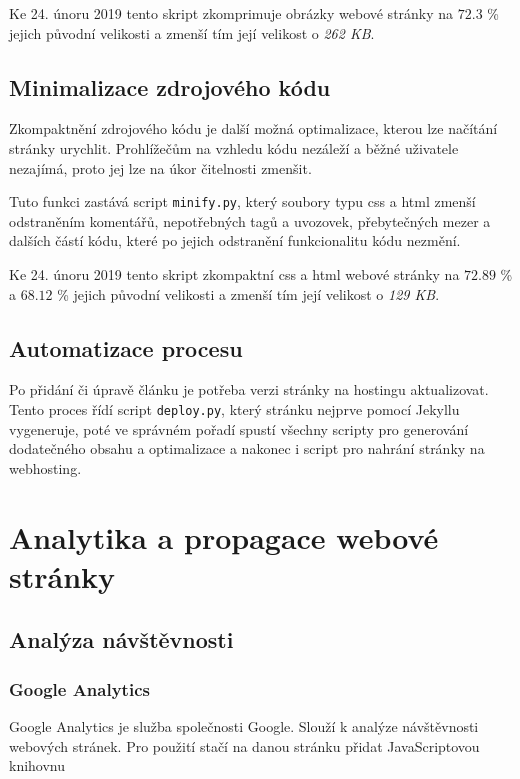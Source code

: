 \documentclass[a4paper, 12pt]{article}
\begin{document}
  Ke 24. únoru 2019 tento skript zkomprimuje obrázky webové stránky na $72.3$ \% jejich původní velikosti a zmenší tím její velikost o \emph{262 KB}.


  \subsection{Minimalizace zdrojového kódu}
  Zkompaktnění zdrojového kódu je další možná optimalizace, kterou lze načítání stránky urychlit. Prohlížečům na vzhledu kódu nezáleží a běžné uživatele nezajímá, proto jej lze na úkor čitelnosti zmenšit.

  Tuto funkci zastává script \texttt{minify.py}, který soubory typu \gls{css} a \gls{html} zmenší odstraněním komentářů, nepotřebných tagů a uvozovek, přebytečných mezer a dalších částí kódu, které po jejich odstranění funkcionalitu kódu nezmění.

  Ke 24. únoru 2019 tento skript zkompaktní \gls{css} a \gls{html} webové stránky na $72.89$ \% a $68.12$ \% jejich původní velikosti a zmenší tím její velikost o \emph{129 KB}.


  \subsection{Automatizace procesu}
  Po přidání či úpravě článku je potřeba verzi stránky na hostingu aktualizovat. Tento proces řídí script \texttt{deploy.py}, který stránku nejprve pomocí Jekyllu vygeneruje, poté ve správném pořadí spustí všechny scripty pro generování dodatečného obsahu a optimalizace a nakonec i script pro nahrání stránky na webhosting.


  \section{Analytika a propagace webové stránky}

  \subsection{Analýza návštěvnosti}

  \subsubsection{Google Analytics}
  Google Analytics je služba společnosti Google. Slouží k analýze návštěvnosti webových stránek. Pro použití stačí na danou stránku přidat JavaScriptovou knihovnu %
\end{document}

